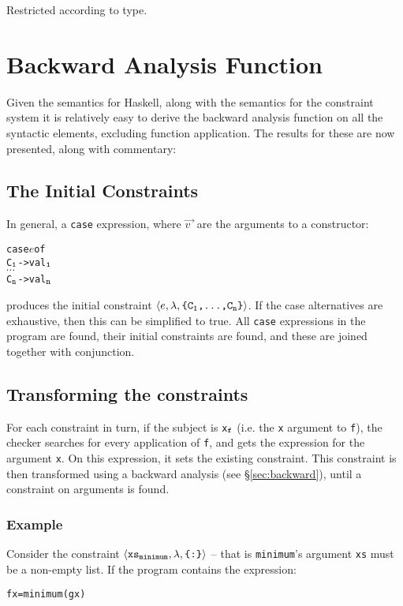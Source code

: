 \documentclass[preprint]{sigplanconf}
\newcommand{\T}[1]{\texttt{#1}}
\newcommand{\tup}[1]{\ensuremath{\langle #1 \rangle}}
\newcounter{exmp}
\newcommand{\yesexample}{\subsubsection*{Example \arabic{exmp}}\addtocounter{exmp}{1}}
\newenvironment{code}{\begin{alltt}\small}{\end{alltt}}
\renewcommand{\c}[3]{\tup{\T{#1},\T{#2},\T{\{#3\}}}}
\newcommand{\cc}[2]{\c{#1}{$\lambda$}{#2}}
\newcommand{\s}[1]{\ensuremath{_{\tt #1}}} %
\newcommand{\vecto}[1]{\overrightarrow{#1\;}}
\begin{document}
Restricted according to type.

\section{Backward Analysis Function}
\label{chap:backward}

Given the semantics for Haskell, along with the semantics for the constraint
system it is relatively easy to derive the backward analysis function on all
the syntactic elements, excluding function application. The results for these
are now presented, along with commentary:

\subsection{The Initial Constraints}

In general, a \T{case} expression, where $\vecto{v}$ are the
arguments to a constructor:

\begin{code}
 case \(e\) of
     C\s{1} -> val\s{1}
     \(\cdots\)
     C\s{n} -> val\s{n}
\end{code}

\noindent produces the initial constraint
\cc{$e$}{C\s{1},\ldots,C\s{n}}. If the case alternatives are
exhaustive, then this can be simplified to true. All \T{case}
expressions in the program are found, their initial constraints are
found, and these are joined together with conjunction.

\subsection{Transforming the constraints}

For each constraint in turn, if the subject is \T{x\s{f}} (i.e. the
\T{x} argument to \T{f}), the checker searches for every application
of \T{f}, and gets the expression for the argument \T{x}. On this
expression, it sets the existing constraint. This constraint is then
transformed using a backward analysis (see \S\ref{sec:backward}),
until a constraint on arguments is found.

\yesexample

Consider the constraint \cc{xs\s{minimum}}{:} -- that is
\T{minimum}'s argument \T{xs} must be a non-empty list. If the
program contains the expression:

\begin{code}
f x = minimum (g x)
\end{code}
\end{document}
